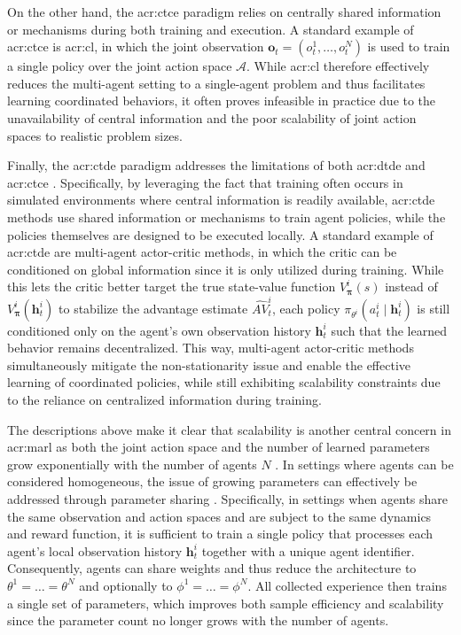 On the other hand, the \gls{acr:ctce} paradigm relies on centrally shared information or mechanisms during both training and execution. A standard example of \gls{acr:ctce} is \gls{acr:cl}, in which the joint observation $\mathbf{o}_t=(o^1_t,\dots,o^N_t)$ is used to train a single policy over the joint action space $\mathcal{A}$. While \gls{acr:cl} therefore effectively reduces the multi-agent setting to a single-agent problem and thus facilitates learning coordinated behaviors, it often proves infeasible in practice due to the unavailability of central information and the poor scalability of joint action spaces to realistic problem sizes.

Finally, the \gls{acr:ctde} paradigm addresses the limitations of both \gls{acr:dtde} and \gls{acr:ctce} \citep{Stefanomarlbook}. Specifically, by leveraging the fact that training often occurs in simulated environments where central information is readily available, \gls{acr:ctde} methods use shared information or mechanisms to train agent policies, while the policies themselves are designed to be executed locally. A standard example of \gls{acr:ctde} are multi-agent actor-critic methods, in which the critic can be conditioned on global information since it is only utilized during training. While this lets the critic better target the true state-value function $V^i_{\boldsymbol{\pi}}(s)$ instead of $V^i_{\boldsymbol{\pi}}(\mathbf{h}^i_t)$ to stabilize the advantage estimate $\widehat{AV}^i_t$, each policy $\pi_{\theta^i}(a^i_t\mid\mathbf{h}^i_t)$ is still conditioned only on the agent's own observation history $\mathbf{h}^i_t$ such that the learned behavior remains decentralized. This way, multi-agent actor-critic methods simultaneously mitigate the non-stationarity issue and enable the effective learning of coordinated policies, while still exhibiting scalability constraints due to the reliance on centralized information during training. 

The descriptions above make it clear that scalability is another central concern in \gls{acr:marl} as both the joint action space and the number of learned parameters grow exponentially with the number of agents $N$ \citep{Stefanomarlbook}. In settings where agents can be considered homogeneous, the issue of growing parameters can effectively be addressed through parameter sharing \citep{christianos2021scaling}. Specifically, in settings when agents share the same observation and action spaces and are subject to the same dynamics and reward function, it is sufficient to train a single policy that processes each agent's local observation history $\mathbf{h}_{t}^{i}$ together with a unique agent identifier. Consequently, agents can share weights and thus reduce the architecture to \(\theta^1=\dots=\theta^N\) and optionally to \(\phi^1=\dots=\phi^N\). All collected experience then trains a single set of parameters, which improves both sample efficiency and scalability since the parameter count no longer grows with the number of agents.

